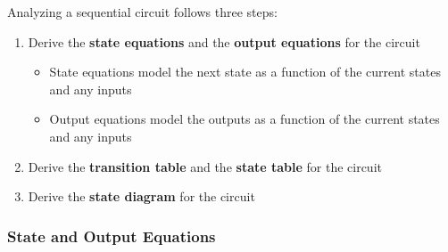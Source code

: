 \documentclass[12pt]{article}
\begin{document}
Analyzing a sequential circuit follows three steps:
\begin{enumerate}
  \itemsep0em
  \item Derive the \textbf{state equations} and the \textbf{output equations} for the
    circuit
    \begin{itemize}
      \itemsep0em
      \item State equations model the next state as a function of the current states and
        any inputs
      \item Output equations model the outputs as a function of the current states and any
        inputs
    \end{itemize}
  \item Derive the \textbf{transition table} and the \textbf{state table} for the circuit
  \item Derive the \textbf{state diagram} for the circuit
\end{enumerate}

\subsubsection{State and Output Equations}
\label{sssec:stateAndOutputEquations}
\end{document}
